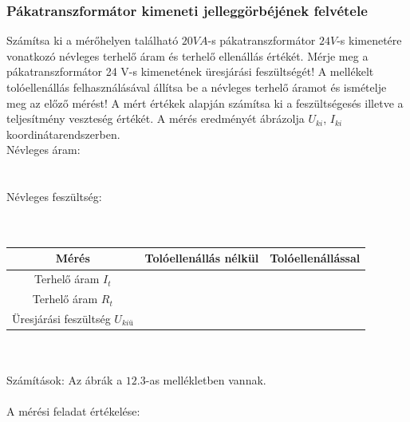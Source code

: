 \documentclass[10pt,a4paper]{article}
\begin{document}
 \subsubsection{Pákatranszformátor kimeneti jelleggörbéjének felvétele}
 Számítsa ki a mérőhelyen található $20 VA$-s pákatranszformátor $24 V$-s
kimenetére vonatkozó névleges terhelő áram és terhelő ellenállás értékét. Mérje
meg a pákatranszformátor 24 V-s kimenetének üresjárási feszültségét! A
mellékelt tolóellenállás felhasználásával állítsa be a névleges terhelő áramot és
ismételje meg az előző mérést! A mért értékek alapján számítsa ki a
feszültségesés illetve a teljesítmény veszteség értékét. A mérés eredményét
ábrázolja $U_{ki}$, $I_{ki}$ koordinátarendszerben.
$$$$ 
Névleges áram:
$$$$ \\\\
Névleges feszültség:
$$$$
\\\\\begin{tabular}{|c|c|c|}
\hline 
Mérés & Tolóellenállás nélkül & Tolóellenállással \\ 
\hline 
Terhelő áram $I_t$ &  &  \\ 
\hline 
Terhelő áram $R_t$ &  &  \\ 
\hline 
Üresjárási feszültség $U_{kiü}$ &  &  \\ 
\hline 
\end{tabular} \\\\
Számítások:
\newpage
Az ábrák a $12.3$-as mellékletben vannak.
\\\\
A mérési feladat értékelése:$$$$ $$$$ $$$$
\tableofcontents
\end{document}

